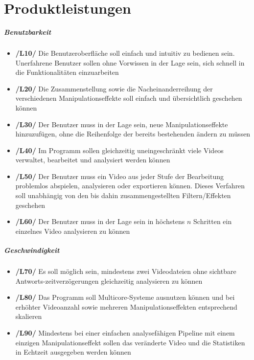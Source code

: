 \documentclass{article}
\begin{document}
\section{Produktleistungen}

\subparagraph{Benutzbarkeit}
\begin{itemize}
\item{\textbf{/L10/} Die Benutzeroberfläche soll einfach und intuitiv zu bedienen sein. Unerfahrene Benutzer sollen ohne Vorwissen in der Lage sein, sich schnell in die Funktionalitäten einzuarbeiten}
\item{\textbf{/L20/} Die Zusammenstellung sowie die Nacheinanderreihung der verschiedenen Manipulationseffekte soll einfach und übersichtlich geschehen können}
\item{\textbf{/L30/} Der Benutzer muss in der Lage sein, neue Manipulationseffekte hinzuzufügen, ohne die Reihenfolge der bereits bestehenden ändern zu müssen}
\item{\textbf{/L40/} Im Programm sollen gleichzeitig uneingeschränkt viele Videos verwaltet, bearbeitet und analysiert werden können}
\item{\textbf{/L50/} Der Benutzer muss ein Video aus jeder Stufe der Bearbeitung problemlos abspielen, analysieren oder exportieren können. Dieses Verfahren soll unabhängig von den bis dahin zusammengestellten Filtern/Effekten geschehen}
\item{\textbf{/L60/} Der Benutzer muss in der Lage sein in höchstens $n$ Schritten ein einzelnes Video analysieren zu können}
\end{itemize}

\subparagraph{Geschwindigkeit}

\begin{itemize}
\item{\textbf{/L70/} Es soll möglich sein, mindestens zwei Videodateien ohne sichtbare Antworts-zeitverzögerungen gleichzeitig analysieren zu können}
\item{\textbf{/L80/} Das Programm soll Multicore-Systeme ausnutzen können und bei erhöhter Videoanzahl sowie mehreren Manipulationseffekten entsprechend skalieren}
\item{\textbf{/L90/} Mindestens bei einer einfachen analysefähigen Pipeline mit einem einzigen Manipulationseffekt sollen das veränderte Video und die Statistiken in Echtzeit ausgegeben werden können}
\end{itemize}
\end{document}
